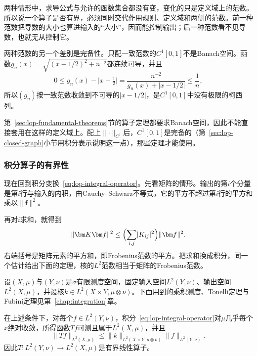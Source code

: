 两种情形中，求导公式与允许的函数集合都没有变，变化的只是定义域上的范数。所以说一个算子是否有界，必须同时交代作用规则、定义域和两侧的范数。前一种范数把导数的大小也算进输入的“大小”，因而能控制输出；后一种范数看不见导数，也就无从控制它。

两种范数的另一个差别是完备性。只配一致范数的$C^1[0,1]$不是Banach空间。函数$g_n(x)=\sqrt{(x-1/2)^2+n^{-2}}$都连续可导，并且
\[
 0\leq g_n(x)-\lvert x-\tfrac12\rvert=\frac{n^{-2}}{g_n(x)+\lvert x-1/2\rvert}\leq\frac1n,
\]
所以$(g_n)$按一致范数收敛到不可导的$\lvert x-1/2\rvert$，是$C^1[0,1]$中没有极限的柯西列。

第~\ref{sec:lop-fundamental-theorems}节的算子定理都要求Banach空间，因此不能直接套用在这样的定义域上。配上$\lVert\cdot\rVert_{C^1}$后，$C^1[0,1]$是完备的（第~\ref{sec:lop-closed-graph}小节用积分表示说明这一点），那些定理才能使用。

\subsubsection{积分算子的有界性}
\label{sec:lop-integral-bounded}

现在回到积分变换~\eqref{eq:lop-integral-operator}。先看矩阵的情形。输出的第$i$个分量是第$i$行与输入的内积，由Cauchy--Schwarz不等式，它的平方不超过第$i$行的平方和乘以$\lVert\bm f\rVert^2$。

再对$i$求和，就得到
\[
 \lVert\bm K\bm f\rVert^2\leq\Bigl(\sum_{i,j}\lvert K_{ij}\rvert^2\Bigr)\lVert\bm f\rVert^2.
\]
右端括号是矩阵元素的平方和，即Frobenius范数的平方。把求和换成积分，同一个估计给出下面的定理，核的$L^2$范数相当于矩阵的Frobenius范数。

设$(X,\mu)$与$(Y,\nu)$是$\sigma$有限测度空间，固定输入空间$L^2(Y,\nu)$、输出空间$L^2(X,\mu)$，并设核$k\in L^2(X\times Y,\mu\otimes\nu)$。下面用到的乘积测度、Tonelli定理与Fubini定理见第~\ref{chap:integration}章。

\begin{theorem}[平方可积核的有界性]
\label{thm:lop-hs-bounded}
在上述条件下，对每个$f\in L^2(Y,\nu)$，积分~\eqref{eq:lop-integral-operator}对$\mu$几乎每个$x$绝对收敛，所得函数$Tf$可测且属于$L^2(X,\mu)$，并且
\begin{equation}
 \lVert Tf\rVert_{L^2(X,\mu)}\leq\lVert k\rVert_{L^2(X\times Y,\mu\otimes\nu)}\lVert f\rVert_{L^2(Y,\nu)} .
 \label{eq:lop-hs-bound}
\end{equation}
因此$T:L^2(Y,\nu)\to L^2(X,\mu)$是有界线性算子。
\end{theorem}

